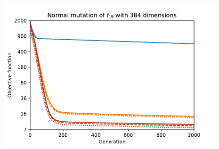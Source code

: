 \begin{figure}[ht!]
\begin{minipage}[t]{0.32\textwidth}
        \includegraphics[width=\textwidth]{img/runs/fitness_es_mutation_f19_dim384_AddFromNormal.pdf}
    \end{minipage}


\end{figure}
